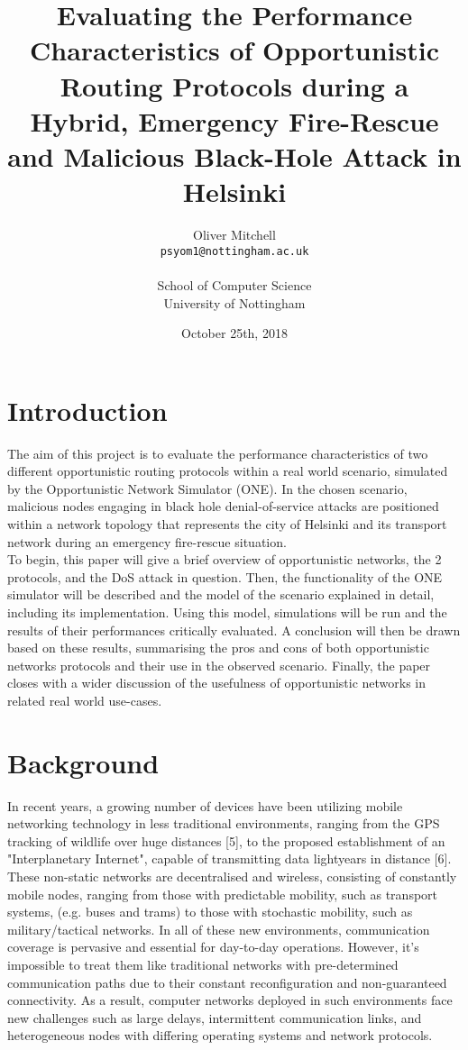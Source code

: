 \documentclass{article}
\title{Evaluating the Performance Characteristics of Opportunistic Routing Protocols during a Hybrid, Emergency Fire-Rescue and Malicious Black-Hole Attack in Helsinki}
\author{
  Oliver Mitchell\\
  \texttt{psyom1@nottingham.ac.uk}\\\\
  \textnormal{School of Computer Science}\\
  \textnormal{University of Nottingham}
}
\date{October 25th, 2018}
\begin{document}
\maketitle
 
\tableofcontents
\newpage

\section{Introduction}
The aim of this project is to evaluate the performance characteristics of two different opportunistic routing protocols within a real world scenario, simulated by the Opportunistic Network Simulator (ONE). In the chosen scenario, malicious nodes engaging in black hole denial-of-service attacks are positioned within a network topology that represents the city of Helsinki and its transport network during an emergency fire-rescue situation.\\
\newline
To begin, this paper will give a brief overview of opportunistic networks, the 2 protocols, and the DoS attack in question. Then, the functionality of the ONE simulator will be described and the model of the scenario explained in detail, including its implementation. Using this model, simulations will be run and the results of their performances critically evaluated. A conclusion will then be drawn based on these results, summarising the pros and cons of both opportunistic networks protocols and their use in the observed scenario. Finally, the paper closes with a wider discussion of the usefulness of opportunistic networks in related real world use-cases.

\section{Background}
In recent years, a growing number of devices have been utilizing mobile networking technology in less traditional environments, ranging from the GPS tracking of wildlife over huge distances [5], to the proposed establishment of an "Interplanetary Internet", capable of transmitting data lightyears in distance [6]. These non-static networks are decentralised and wireless, consisting of constantly mobile nodes, ranging from those with predictable mobility, such as transport systems, (e.g. buses and trams) to those with stochastic mobility, such as military/tactical networks. In all of these new environments, communication coverage is pervasive and essential for day-to-day operations. However, it's impossible to treat them like traditional networks with pre-determined communication paths due to their constant reconfiguration and non-guaranteed connectivity. As a result, computer networks deployed in such environments face new challenges such as large delays, intermittent communication links, and heterogeneous nodes with differing operating systems and network protocols.
\end{document}

